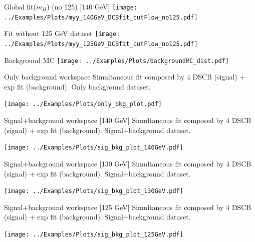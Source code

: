 \documentclass[10pt,UKenglish, leqno, xcolor = dvipsnames]{beamer}
\begin{document}
		\begin{frame}{Global fit($m_H$) (no 125) [140 GeV]}
			\vfill
			\texttt{[image: ../Examples/Plots/myy\_140GeV\_DCBfit\_cutFlow\_no125.pdf]}
			\vfill
		\end{frame}
	
		\begin{frame}{Fit without 125 GeV dataset}
			\vfill
			\texttt{[image: ../Examples/Plots/myy\_125GeV\_DCBfit\_cutFlow\_no125.pdf]}
			\vfill 
		\end{frame}
	
		\begin{frame}{Background MC}
			\vfill
			\texttt{[image: ../Examples/Plots/backgroundMC\_dist.pdf]}
			\vfill 
		\end{frame}
	
		\begin{frame}{Only background workspace}
			\vfill
			Simultaneous fit composed by 4 DSCB (signal) + exp fit (background). Only background dataset.
			\begin{center}
				\texttt{[image: ../Examples/Plots/only\_bkg\_plot.pdf]}
			\end{center}
			\vfill
		\end{frame}
	
		\begin{frame}{Signal+background workspace [140 GeV]}
			\vfill
			Simultaneous fit composed by 4 DSCB (signal) + exp fit (background). Signal+background dataset.
			\begin{center}
				\texttt{[image: ../Examples/Plots/sig\_bkg\_plot\_140GeV.pdf]}
			\end{center}
			\vfill
		\end{frame}
	
		\begin{frame}{Signal+background workspace [130 GeV]}
			\vfill
			Simultaneous fit composed by 4 DSCB (signal) + exp fit (background). Signal+background dataset.
			\begin{center}
				\texttt{[image: ../Examples/Plots/sig\_bkg\_plot\_130GeV.pdf]}
			\end{center}
			\vfill
		\end{frame}

		\begin{frame}{Signal+background workspace [125 GeV]}
			\vfill
			Simultaneous fit composed by 4 DSCB (signal) + exp fit (background). Signal+background dataset.
			\begin{center}
				\texttt{[image: ../Examples/Plots/sig\_bkg\_plot\_125GeV.pdf]}
			\end{center}
			\vfill
		\end{frame}
	
\end{document}
